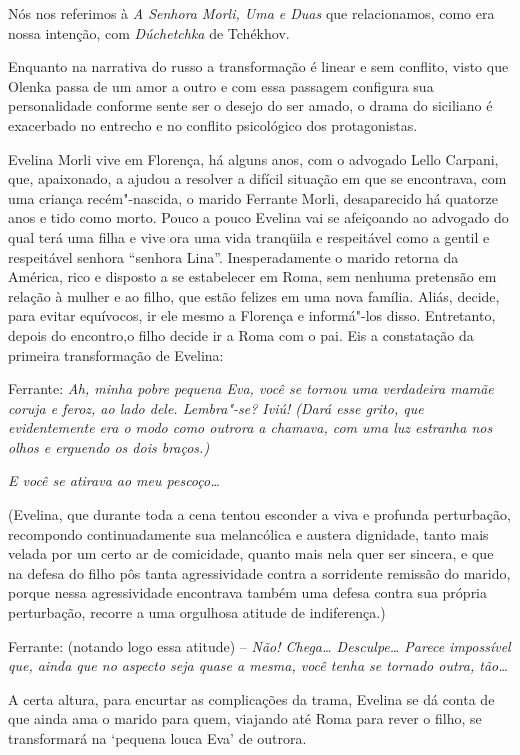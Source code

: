 Nós nos referimos à \emph{A Senhora Morli, Uma e Duas} que relacionamos,
como era nossa intenção, com \emph{Dúchetchka} de Tchékhov.

Enquanto na narrativa do russo a transformação é linear e sem conflito,
visto que Olenka passa de um amor a outro e com essa passagem configura
sua personalidade conforme sente ser o desejo do ser amado, o drama do
siciliano é exacerbado no entrecho e no conflito psicológico dos
protagonistas.

Evelina Morli vive em Florença, há alguns anos, com o advogado Lello
Carpani, que, apaixonado, a ajudou a resolver a difícil situação em que
se encontrava, com uma criança recém"-nascida, o marido Ferrante Morli,
desaparecido há quatorze anos e tido como morto. Pouco a pouco Evelina
vai se afeiçoando ao advogado do qual terá uma filha e vive ora uma vida
tranqüila e respeitável como a gentil e respeitável senhora ``senhora
Lina''. Inesperadamente o marido retorna da América, rico e disposto a
se estabelecer em Roma, sem nenhuma pretensão em relação à mulher e ao
filho, que estão felizes em uma nova família. Aliás, decide, para evitar
equívocos, ir ele mesmo a Florença e informá"-los disso. Entretanto,
depois do encontro,o filho decide ir a Roma com o pai. Eis a constatação
da primeira transformação de Evelina:

Ferrante: \emph{Ah, minha pobre pequena Eva, você se tornou uma
verdadeira mamãe coruja e feroz, ao lado dele. Lembra"-se? Iviú! (Dará
esse grito, que evidentemente era o modo como outrora a chamava, com uma
luz estranha nos olhos e erguendo os dois braços.)}

\emph{E você se atirava ao meu pescoço\ldots{}}

(Evelina, que durante toda a cena tentou esconder a viva e profunda
perturbação, recompondo continuadamente sua melancólica e austera
dignidade, tanto mais velada por um certo ar de comicidade, quanto mais
nela quer ser sincera, e que na defesa do filho pôs tanta agressividade
contra a sorridente remissão do marido, porque nessa agressividade
encontrava também uma defesa contra sua própria perturbação, recorre a
uma orgulhosa atitude de indiferença.)

Ferrante: (notando logo essa atitude) -- \emph{Não! Chega\ldots{} Desculpe\ldots{}
Parece impossível que, ainda que no aspecto seja quase a mesma, você
tenha se tornado outra, tão\ldots{}}

A certa altura, para encurtar as complicações da trama, Evelina se dá
conta de que ainda ama o marido para quem, viajando até Roma para rever
o filho, se transformará na `pequena louca Eva' de outrora.

